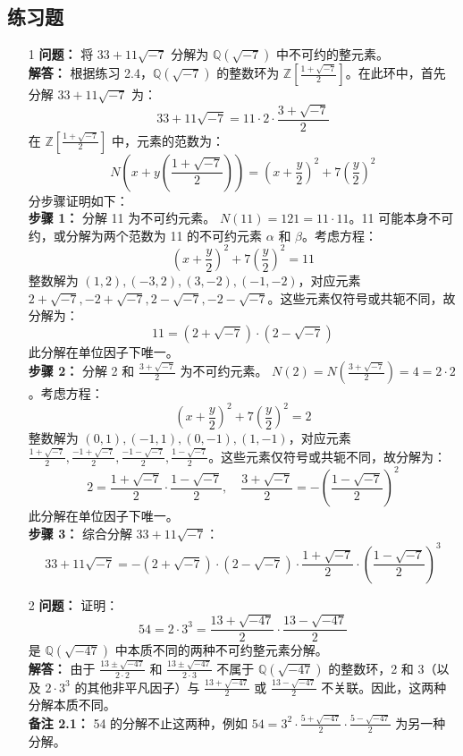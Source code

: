 \documentclass[UTF8]{ctexart}
\begin{document}
\subsection{练习题}

\begin{enumerate}

\begin{enumerate}

\item[1] 
\textbf{问题：} 将 \(33 + 11 \sqrt{-7}\) 分解为 \(\mathbb{Q}(\sqrt{-7})\) 中不可约的整元素。\\
\textbf{解答：} 根据练习 2.4，\(\mathbb{Q}(\sqrt{-7})\) 的整数环为 \(\mathbb{Z}\left[\frac{1 + \sqrt{-7}}{2}\right]\)。在此环中，首先分解 \(33 + 11 \sqrt{-7}\) 为：
\[
33 + 11 \sqrt{-7} = 11 \cdot 2 \cdot \frac{3 + \sqrt{-7}}{2}
\]
在 \(\mathbb{Z}\left[\frac{1 + \sqrt{-7}}{2}\right]\) 中，元素的范数为：
\[
N\left(x + y \left(\frac{1 + \sqrt{-7}}{2}\right)\right) = \left(x + \frac{y}{2}\right)^2 + 7 \left(\frac{y}{2}\right)^2
\]
分步骤证明如下：\\
\textbf{步骤 1：} 分解 11 为不可约元素。  
\(N(11) = 121 = 11 \cdot 11\)。11 可能本身不可约，或分解为两个范数为 11 的不可约元素 \(\alpha\) 和 \(\beta\)。考虑方程：
\[
\left(x + \frac{y}{2}\right)^2 + 7 \left(\frac{y}{2}\right)^2 = 11
\]
整数解为 \((1, 2), (-3, 2), (3, -2), (-1, -2)\)，对应元素 \(2 + \sqrt{-7}, -2 + \sqrt{-7}, 2 - \sqrt{-7}, -2 - \sqrt{-7}\)。这些元素仅符号或共轭不同，故分解为：
\[
11 = (2 + \sqrt{-7}) \cdot (2 - \sqrt{-7})
\]
此分解在单位因子下唯一。\\
\textbf{步骤 2：} 分解 2 和 \(\frac{3 + \sqrt{-7}}{2}\) 为不可约元素。  
\(N(2) = N\left(\frac{3 + \sqrt{-7}}{2}\right) = 4 = 2 \cdot 2\)。考虑方程：
\[
\left(x + \frac{y}{2}\right)^2 + 7 \left(\frac{y}{2}\right)^2 = 2
\]
整数解为 \((0, 1), (-1, 1), (0, -1), (1, -1)\)，对应元素 \(\frac{1 + \sqrt{-7}}{2}, \frac{-1 + \sqrt{-7}}{2}, \frac{-1 - \sqrt{-7}}{2}, \frac{1 - \sqrt{-7}}{2}\)。这些元素仅符号或共轭不同，故分解为：
\[
2 = \frac{1 + \sqrt{-7}}{2} \cdot \frac{1 - \sqrt{-7}}{2}, \quad \frac{3 + \sqrt{-7}}{2} = -\left(\frac{1 - \sqrt{-7}}{2}\right)^2
\]
此分解在单位因子下唯一。\\
\textbf{步骤 3：} 综合分解 \(33 + 11 \sqrt{-7}\)：
\[
33 + 11 \sqrt{-7} = -(2 + \sqrt{-7}) \cdot (2 - \sqrt{-7}) \cdot \frac{1 + \sqrt{-7}}{2} \cdot \left(\frac{1 - \sqrt{-7}}{2}\right)^3
\]

\item[2] 
\textbf{问题：} 证明：
\[
54 = 2 \cdot 3^3 = \frac{13 + \sqrt{-47}}{2} \cdot \frac{13 - \sqrt{-47}}{2}
\]
是 \(\mathbb{Q}(\sqrt{-47})\) 中本质不同的两种不可约整元素分解。\\
\textbf{解答：} 由于 \(\frac{13 \pm \sqrt{-47}}{2 \cdot 2}\) 和 \(\frac{13 \pm \sqrt{-47}}{2 \cdot 3}\) 不属于 \(\mathbb{Q}(\sqrt{-47})\) 的整数环，2 和 3（以及 \(2 \cdot 3^3\) 的其他非平凡因子）与 \(\frac{13 + \sqrt{-47}}{2}\) 或 \(\frac{13 - \sqrt{-47}}{2}\) 不关联。因此，这两种分解本质不同。\\
\textbf{备注 2.1：} 54 的分解不止这两种，例如 \(54 = 3^2 \cdot \frac{5 + \sqrt{-47}}{2} \cdot \frac{5 - \sqrt{-47}}{2}\) 为另一种分解。


\end{enumerate}
\end{enumerate}
\end{document}
